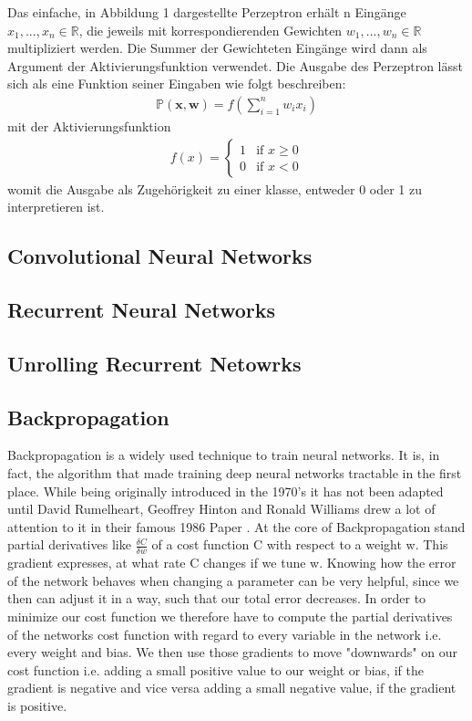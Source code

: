 Das einfache, in Abbildung 1 dargestellte Perzeptron erhält n Eingänge $x_1,...,x_n \in \mathbb{R}$, die jeweils mit korrespondierenden Gewichten $w_1,...,w_n \in \mathbb{R}$ multipliziert werden. Die Summer der Gewichteten Eingänge wird dann als Argument der Aktivierungsfunktion verwendet. Die Ausgabe des Perzeptron lässt sich als eine Funktion seiner Eingaben wie folgt beschreiben:
\begin{align*}
	\mathbb{P}(\boldsymbol{x}, \boldsymbol{w}) = f(\sum_{i=1}^{n}w_ix_i)
\end{align*}
mit der Aktivierungsfunktion
\begin{align*}
	f(x) = \begin{cases} 1 &\mbox{if } x \geq 0 \\ 
	0 & \mbox{if } x < 0 \end{cases} 
\end{align*}
womit die Ausgabe als Zugehörigkeit zu einer klasse, entweder 0 oder 1 zu interpretieren ist.
\subsection{Convolutional Neural Networks}
\subsection{Recurrent Neural Networks}
\subsection{Unrolling Recurrent Netowrks}
\subsection{Backpropagation}
Backpropagation is a widely used technique to train neural networks. It is, in fact, the algorithm that made training deep neural networks tractable in the first place. While being originally introduced in the 1970's it has not been adapted until David Rumelheart, Geoffrey Hinton and Ronald Williams drew a lot of attention to it in their famous 1986 Paper \cite{rumelhart1988learning}. At the core of Backpropagation stand partial derivatives like $\frac{\delta C}{\delta w}$ of a cost function C with respect to a weight w. This gradient expresses, at what rate C changes if we tune w. Knowing how the error of the network behaves when changing a parameter can be very helpful, since we then can adjust it in a way, such that our total error decreases.
In order to minimize our cost function we therefore have to compute the partial derivatives of the networks cost function with regard to every variable in the network i.e. every weight and bias. We then use those gradients to move "downwards" on our cost function i.e. adding a small positive value to our weight or bias, if the gradient is negative and vice versa adding a small negative value, if the gradient is positive.
\\

